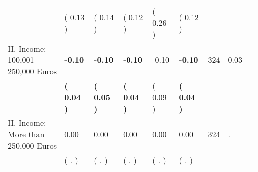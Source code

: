 \begin{tabular}{L{6.2cm} C{1.8cm} C{1.8cm} C{1.8cm} C{1.8cm} C{1.8cm} C{1.8cm} C{0.3cm} C{0.3cm}}
 & (     0.13 ) & (     0.14 ) & (     0.12 ) & (     0.26 ) & (     0.12 )  & \\
H. Income: 100,001-250,000 Euros & \textbf{    -0.10} & \textbf{    -0.10} & \textbf{    -0.10} &     -0.10 & \textbf{    -0.10}  & 324 &       0.03 \\ 
 & \textbf{(     0.04 )} & \textbf{(     0.05 )} & \textbf{(     0.04 )} & (     0.09 ) & \textbf{(     0.04 )}  & \\
H. Income: More than 250,000 Euros &      0.00 &      0.00 &      0.00 &      0.00 &      0.00  & 324 &          . \\ 
 & (        . ) & (        . ) & (        . ) & (        . ) & (        . )  & \\
\bottomrule
\end{tabular}
